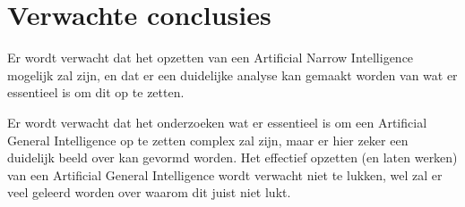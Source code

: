 \section{Verwachte conclusies}
\label{sec:verwachte_conclusies}
Er wordt verwacht dat het opzetten van een Artificial Narrow Intelligence mogelijk zal zijn, en dat er een duidelijke analyse kan gemaakt worden van wat er essentieel is om dit op te zetten. 

Er wordt verwacht dat het onderzoeken wat er essentieel is om een Artificial General Intelligence op te zetten complex zal zijn, maar er hier zeker een duidelijk beeld over kan gevormd worden. Het effectief opzetten (en laten werken) van een Artificial General Intelligence wordt verwacht niet te lukken, wel zal er veel geleerd worden over waarom dit juist niet lukt.


